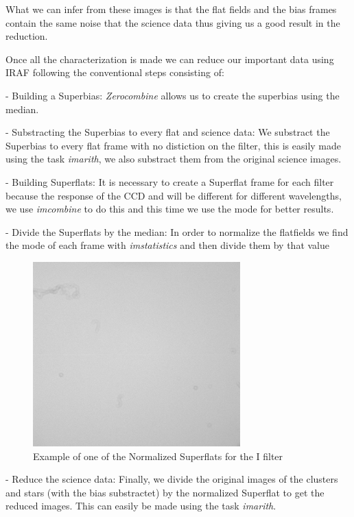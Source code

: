 What we can infer from these images is that the flat fields and the bias frames contain the same noise that the science data thus giving us a good result in the reduction.

Once all the characterization is made we can reduce our important data using IRAF following the conventional steps consisting of: 

- Building a Superbias: \textit{Zerocombine} allows us to create the superbias using the median.

- Substracting the Superbias to every flat and science data: We substract the Superbias to every flat frame with no distiction on the filter, this is easily made using the task \textit{imarith}, we also substract them from the original science images.

- Building Superflats: It is necessary to create a Superflat frame for each filter because the response of the CCD and will be different for different wavelengths, we use \textit{imcombine} to do this and this time we use the mode for better results.   

- Divide the Superflats by the median: In order to normalize the flatfields we find the mode of each frame with \textit{imstatistics} and then divide them by that value


\begin{figure}[H]
\centering
\includegraphics[width=8cm]{images/flat_I.png}
\caption[Normalized Superflat for the filter I]{Example of one of the Normalized Superflats for the I filter}
\end{figure}

- Reduce the science data: Finally, we divide the original images of the clusters and stars (with the bias substractet) by the normalized Superflat to get the reduced images. This can easily be made using the task \textit{imarith}.

